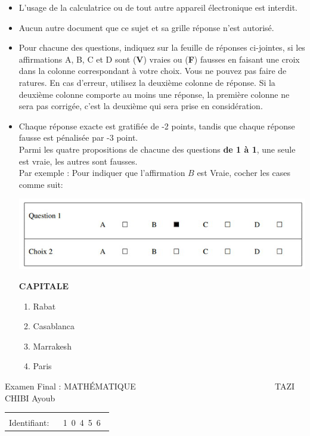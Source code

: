 \documentclass{book}%
\begin{document}
\begin{itemize}%
\item%
L'usage de la calculatrice ou de tout autre appareil électronique est interdit.%
\item%
Aucun autre document que ce sujet et sa grille réponse n'est autorisé.%
\item%
Pour chacune des questions, indiquez sur la feuille de réponses ci-jointes, si les affirmations A, B, C et D sont (\textbf{V}) vraies ou (\textbf{F}) fausses en faisant une croix dans la colonne correspondant à votre choix. Vous ne pouvez pas faire de ratures. En cas d'erreur, utilisez la deuxième colonne de réponse. Si la deuxième colonne comporte au moins une réponse, la première colonne ne sera pas corrigée, c'est la deuxième qui sera prise en considération.%
\item%
Chaque réponse exacte est gratifiée de -2 points, tandis que chaque réponse fausse est pénalisée par -3 point. \\ 	Parmi les quatre propositions de chacune des questions \textbf{de 1 à 1}, une seule est vraie, les autres sont fausses. \\ 	Par exemple : Pour indiquer que l'affirmation $B$ est Vraie, cocher les cases comme suit:  \\ \begin{center}	\includegraphics[scale=0.8]{reponses.png} \end{center}%
\thispagestyle{empty}%
\begin{exercise}%
\textbf{CAPITALE }%
\begin{enumerate}[label=\textbf{\Alph*. }]%
\item%
Rabat%
\item%
Casablanca%
\item%
Marrakesh%
\item%
Paris%
\end{enumerate}%
\end{exercise}%
\end{itemize}%
\newpage%
\thispagestyle{empty}%
Examen Final : MATHÉMATIQUE $\qquad \qquad \qquad \qquad \qquad \qquad \qquad \qquad$ TAZI CHIBI Ayoub%
\begin{flushright}%
\begin{tabular}{|l|}%
\hline%
 \\%
\thispagestyle{empty}%
Identifiant: $\quad$ {\Large 1~0~4~5~6~}%
 \\%
\hline%
\end{tabular}%
\end{flushright}%
\end{document}
